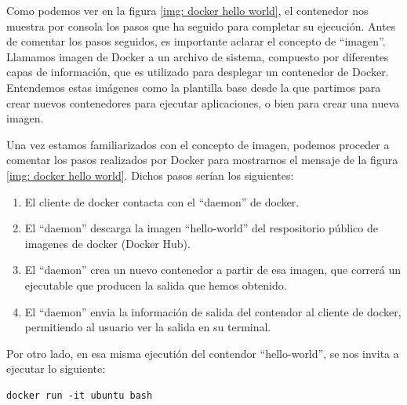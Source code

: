 \documentclass[12pt]{article}
\begin{document}
	\noindent Como podemos ver en la figura \ref{img: docker hello world}, el contenedor nos muestra por consola los pasos que ha seguido para completar su ejecución. Antes de comentar los pasos seguidos, es importante aclarar el concepto de ``imagen''. \\
	
	\noindent Llamamos imagen de Docker a un archivo de sistema, compuesto por diferentes capas de información, que es utilizado para desplegar un contenedor de Docker. Entendemos estas imágenes como la plantilla base desde la que partimos para crear nuevos contenedores para ejecutar aplicaciones, o bien para crear una nueva imagen.\\
	
	\pagebreak
	
	\noindent Una vez estamos familiarizados con el concepto de imagen, podemos proceder a comentar los pasos realizados por Docker para mostrarnos el mensaje de la figura \ref{img: docker hello world}. Dichos pasos serían los siguientes:
	\begin{enumerate}
		\item El cliente de docker contacta con el ``daemon'' de docker.
		\item El ``daemon'' descarga la imagen  ``hello-world'' del respositorio público de imagenes de docker (Docker Hub).
		\item El ``daemon'' crea un nuevo contenedor a partir de esa imagen, que correrá un ejecutable que producen la salida que hemos obtenido.
		\item El ``daemon'' envia la información de salida del contendor al cliente de docker, permitiendo al usuario ver la salida en su terminal.
	\end{enumerate}

	\noindent Por otro lado, en esa misma ejecutión del contendor ``hello-world'', se nos invita a ejecutar lo siguiente:
	\begin{verbatim}
docker run -it ubuntu bash
	\end{verbatim}
\end{document}
